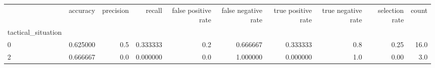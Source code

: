 \begin{tabular}{lrrrrrrrrr}
\toprule
{} &  accuracy &  precision &    recall &  false positive rate &  false negative rate &  true positive rate &  true negative rate &  selection rate &  count \\
tactical\_situation &           &            &           &                      &                      &                     &                     &                 &        \\
\midrule
0                  &  0.625000 &        0.5 &  0.333333 &                  0.2 &             0.666667 &            0.333333 &                 0.8 &            0.25 &   16.0 \\
2                  &  0.666667 &        0.0 &  0.000000 &                  0.0 &             1.000000 &            0.000000 &                 1.0 &            0.00 &    3.0 \\
\bottomrule
\end{tabular}

